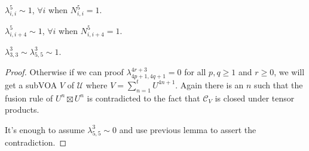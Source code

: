 \documentclass[10pt,a4paper]{amsart}
\begin{document}
\begin{lemma}\label{5,i,i}
$\lambda_{i,i}^5\sim 1$, $\forall i$ when $N_{i,i}^5=1$.
\end{lemma}

\begin{lemma}\label{5,i,i+4}
$\lambda_{i,i+4}^5\sim 1$, $\forall i$ when $N_{i,i+4}^5=1$.
\end{lemma}

\begin{lemma}
$\lambda_{3,3}^3\sim\lambda_{5,5}^3\sim 1$.
\end{lemma}

\begin{proof}
Otherwise if we can proof $\lambda_{4p+1,4q+1}^{4r+3}=0$ for all $p,q\geq 1$ and $r\geq 0$,
we will get a subVOA $V$ of $\mathcal{U}$ where $V=\sum_{n=1}^t U^{4n+1}$.
Again there is an $n$ such that the fusion rule of $U^n\boxtimes U^n$ is contradicted to the fact that $\mathcal{C}_V$ is closed under tensor products.


It's enough to assume $\lambda_{5,5}^3\sim 0$ and use previous lemma to assert the contradiction.









\end{proof}
\end{document}
